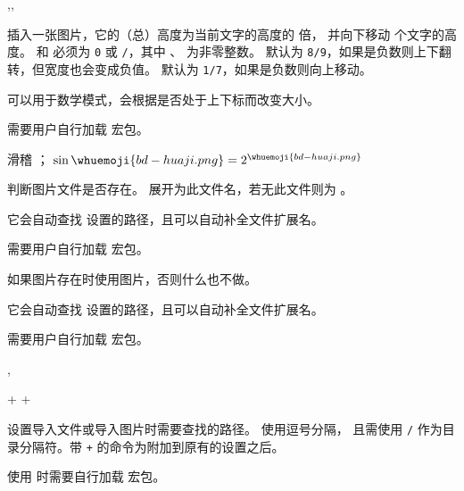 \documentclass[twoside]{book}
\def\xampletext{\par}
\def\xampleprint{\xamplecode \xampleline \xampletext}
\begin{document}
\begin{function}{\whuemoji,\whuemojitotalratio,\whuemojilowerratio}
  \begin{syntax}
    \V\whuemoji {}
  \end{syntax}
插入一张图片，它的（总）高度为当前文字的高度的  倍，
并向下移动  个文字的高度。
 和  
必须为 \texttt{0} 或 \texttt/，其中 、
 为非零整数。
 默认为 \texttt{8/9}，如果是负数则上下翻转，但宽度也会变成负值。
 默认为 \texttt{1/7}，如果是负数则向上移动。

可以用于数学模式，会根据是否处于上下标而改变大小。

需要用户自行加载  宏包。
\end{function}

\begin{xample}
\newcommand{\bdhj}{}
滑稽 \bdhj ； $ \sin\bdhj = 2^\bdhj $
\stopxamplecode
\xampleprint
\end{xample}

\begin{function}{\IfGraphicsExists}
  \begin{syntax}
    \V\IfGraphicsExists {}  
  \end{syntax}
判断图片文件是否存在。 展开为此文件名，若无此文件则为 。

它会自动查找  设置的路径，且可以自动补全文件扩展名。

需要用户自行加载  宏包。
\end{function}

\begin{function}{\InputIfGraphicsExists}
  \begin{syntax}
    \V\InputIfGraphicsExists *  
    \V\InputIfGraphicsExists *   
  \end{syntax}
如果图片存在时使用图片，否则什么也不做。

它会自动查找  设置的路径，且可以自动补全文件扩展名。

需要用户自行加载  宏包。
\end{function}

\begin{function}{\setinputpath,\setgraphicspath}
  \begin{syntax}
    \V\setinputpath      {}
    \V\setinputpath    + 
    \V\setgraphicspath   {}
    \V\setgraphicspath + 
  \end{syntax}
设置导入文件或导入图片时需要查找的路径。 使用逗号分隔，
且需使用 \texttt/ 作为目录分隔符。带 \texttt+ 的命令为附加到原有的设置之后。

使用  时需要自行加载  宏包。
\end{function}
\end{document}

